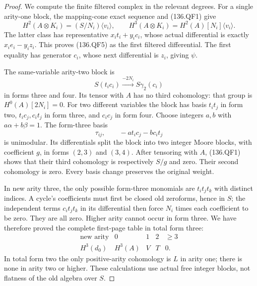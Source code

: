 \begin{proof}
We compute the finite filtered complex in the relevant degrees.
For a single arity-one block, the mapping-cone exact sequence
and (136.QF1) give
\[
 H^2(A\otimes K_i)=(S/N_i)\langle v_i\rangle,
 \qquad H^3(A\otimes K_i)=H^2(A)[N_i]\langle v_i\rangle.
                                                               \tag{136.QF12}
\]
The latter class has representative \(x_i t_i+y_i c_i\),
whose actual differential is exactly
\(x_i e_i-y_i z_i\).  This proves (136.QF5) as the
first filtered differential.  The first equality has generator
\(c_i\), whose next differential is \(z_i\), giving
\(\psi\).

The same-variable arity-two block is
\[
                  S(t_i c_i)\xrightarrow{-2N_i}
                                          S\gamma_2(c_i)
                                                               \tag{136.QF13}
\]
in forms three and four.  Its tensor with \(A\) has no
third cohomology: that group is \(H^0(A)[2N_i]=0\).
For two different variables the block has basis \(t_i t_j\)
in form two, \(t_i c_j,c_i t_j\) in form three, and
\(c_i c_j\) in form four.  Choose integers \(a,b\) with
\(a\alpha+b\beta=1\).  The form-three basis
\[
             \tau_{ij},\qquad -a t_i c_j-b c_i t_j
\]
is unimodular.  Its differentials split the block into two
integer Moore blocks, with coefficient \(g\), in forms
\((2,3)\) and \((3,4)\).  After tensoring with \(A\),
(136.QF1) shows that their third cohomology is respectively
\(S/g\) and zero.  Their second cohomology is zero.
Every basis change preserves the original weight.

In new arity three, the only possible form-three monomials
are \(t_i t_j t_k\) with distinct indices.  A cycle's
coefficients must first be closed old zeroforms, hence in
\(S\); the independent terms \(c_i t_jt_k\) in its
differential then force \(N_i\) times each coefficient
to be zero.  They are all zero.  Higher arity cannot occur
in form three.  We have therefore proved the complete first-page
table in total form three:
\[
 \begin{array}{c|cccc}
 \text{new arity}&0&1&2&\geq3\\ \hline
 H^3(d_0)&H^3(A)&V&T&0.
 \end{array}                                                \tag{136.QF14}
\]
In total form two the only positive-arity cohomology is \(L\)
in arity one; there is none in arity two or higher.  These
calculations use actual free integer blocks, not flatness of
the old algebra over \(S\).


\end{proof}
